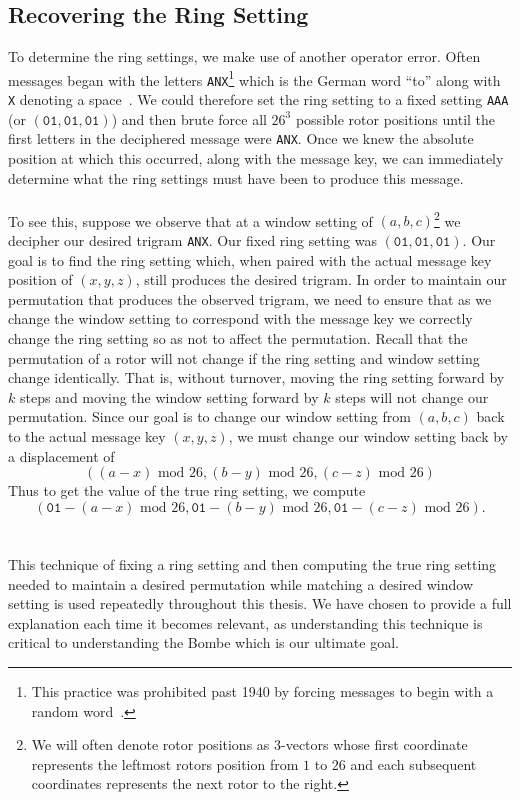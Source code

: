 \subsection{Recovering the Ring Setting}\label{cyclometer_ring_setting}
To determine the ring settings, we make use of another operator
error. Often messages began with the letters
\texttt{ANX}\footnote{This practice was prohibited past 1940 by
forcing messages to begin with a random word~\cite[p.~244]{KozaczukEnigma1984}.} which is
the German word ``to'' along with \texttt{X} denoting a space~\cite[p.~223]{Rejewski1981}. We
could therefore set the ring setting to a fixed setting \texttt{AAA}
(or $(\texttt{01}, \texttt{01}, \texttt{01})$) and then
brute force all $26^3$ possible rotor positions until the first
letters in the deciphered message were \texttt{ANX}. Once we knew the
absolute position at which this occurred, along with the message key,
we can immediately determine what the ring settings must have been to
produce this message.
\\\\To see this, suppose we observe that at a window setting of
$(a,b,c)$\footnote{We will often denote rotor positions as
  $3$-vectors whose first coordinate represents the leftmost rotors
  position from $1$ to $26$ and each subsequent coordinates represents
the next rotor to the right.} we decipher our desired trigram \texttt{ANX}.
Our fixed ring setting was
$(\texttt{01}, \texttt{01}, \texttt{01})$. Our goal is to find the
ring setting which, when paired with the actual message key position
of $(x,y,z)$, still produces the desired trigram. In order to
maintain our permutation that produces the observed trigram, we need
to ensure that as we change the window setting to correspond with the
message key we correctly change the ring setting so as not
to affect the permutation. Recall that the permutation of a rotor
will not change if the ring setting and window setting change
identically. That is, without turnover, moving the ring setting
forward by $k$ steps and moving the window setting forward by $k$
steps will not change our permutation. Since our goal is to change
our window setting from $(a,b,c)$ back to the actual message key
$(x,y,z)$, we must change our window setting back by a displacement of
\[
  ((a-x)\text{ mod } 26, (b-y)\text{ mod }26, (c-z)\text{ mod }26)
\]
Thus to get the value of the true ring setting, we compute
\[
  (\texttt{01} - (a- x)\text{ mod }26, \texttt{01} - (b- y)\text{ mod
    }26, \texttt{01} - (c-
  z)\text{ mod }26).
\]
\\\\This technique of fixing a ring setting and then computing the
true ring setting needed to maintain a desired permutation while
matching a desired window setting is used repeatedly throughout this
thesis. We have chosen to provide a full explanation each time it
becomes relevant, as understanding this technique is critical to
understanding the Bombe which is our ultimate goal.
